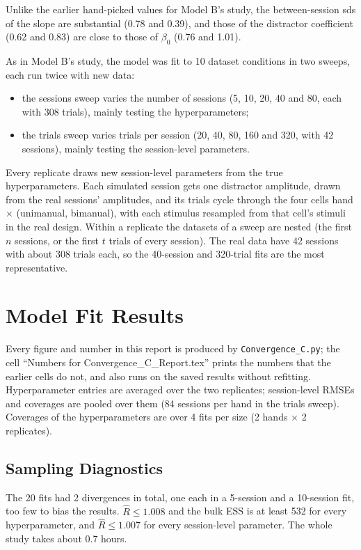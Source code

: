 \documentclass[11pt]{article}
\newcommand{\code}[1]{\texttt{#1}}
\begin{document}
Unlike the earlier hand-picked values for Model B's study, the between-session sds of
the slope are substantial (0.78 and 0.39), and those of the distractor coefficient
(0.62 and 0.83) are close to those of $\beta_0$ (0.76 and 1.01).

As in Model B's study, the model was fit to 10 dataset conditions in two sweeps, each
run twice with new data:
\begin{itemize}
  \item the sessions sweep varies the number of sessions (5, 10, 20, 40 and 80, each
        with 308 trials), mainly testing the hyperparameters;
  \item the trials sweep varies trials per session (20, 40, 80, 160 and 320, with 42
        sessions), mainly testing the session-level parameters.
\end{itemize}
Every replicate draws new session-level parameters from the true hyperparameters.
Each simulated session gets one distractor amplitude, drawn from the real sessions'
amplitudes, and its trials cycle through the four cells hand $\times$
(unimanual, bimanual), with each stimulus resampled from that cell's stimuli in the
real design. Within a replicate the datasets of a sweep are nested (the first $n$
sessions, or the first $t$ trials of every session). The real data have 42 sessions
with about 308 trials each, so the 40-session and 320-trial fits are the most
representative.

\section{Model Fit Results}

Every figure and number in this report is produced by \code{Convergence\_C.py};
the cell ``Numbers for Convergence\_C\_Report.tex'' prints the numbers that the
earlier cells do not, and also runs on the saved results without refitting.
Hyperparameter entries are averaged over the two replicates; session-level RMSEs and
coverages are pooled over them (84 sessions per hand in the trials sweep). Coverages
of the hyperparameters are over 4 fits per size (2 hands $\times$ 2 replicates).

\subsection{Sampling Diagnostics}
The 20 fits had 2 divergences in total, one each in a 5-session and a 10-session fit,
too few to bias the results. $\hat{R} \le 1.008$ and the bulk ESS is at least 532
for every hyperparameter, and $\hat{R} \le 1.007$ for every session-level parameter. The whole study takes about 0.7 hours.
\end{document}
